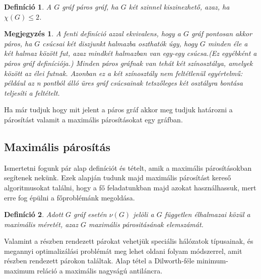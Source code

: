\documentclass[12pt]{article}
\newtheorem{defin}{Definíció}[section]
\newtheorem{megj}{Megjegyzés}[section]
\begin{document}
\begin{defin}
A $G$ gráf páros gráf, ha $G$ két szinnel kiszinezhető, azaz, ha $\chi(G) \leq 2$. ~\cite{szam:Fleiner}
\end{defin}

\begin{megj}
A fenti definíció azzal ekvivalens, hogy a $G$ gráf pontosan akkor páros, ha $G$ csúcsai két diszjunkt halmazba oszthatók úgy, hogy $G$ minden éle a két halmaz között fut, azaz mindkét halmazban van egy-egy csúcsa.(Ez egyébként a páros gráf definíciója.) Minden páros gráfnak van tehát két színosztálya, amelyek között az élei futnak. Azonban ez a két színosztály nem feltétlenül egyértelmű: például az n pontból álló üres gráf csúcsainak tetszőleges két osztályra bontása teljesíti a feltételt.
\end{megj}

Ha már tudjuk hogy mit jelent a páros gráf akkor meg tudjuk határozni a párosítást valamit a maximális párosításokat egy gráfban.\\

\subsection{Maximális párosítás}

Ismertetni fogunk pár alap definíciót és tételt, amik a maximális párosításokban segítenek nekünk. Ezek alapján tudunk majd maximális párosítást kereső algoritmusokat találni, hogy a fő feladatunkban majd azokat használhassuk, mert erre fog épülni a főproblémánk megoldása.\\

\begin{defin}
Adott $G$ gráf esetén $\nu(G)$ jelöli a $G$ független élhalmazai közül a maximális méretét, azaz $G$ maximális párositásának elemszámát. ~\cite{szam:Fleiner}
\end{defin}

Valamint a részben rendezett párokat vehetjük speciális hálózatok típusainak, és megannyi optimalizálási problémát meg lehet oldani folyam módszerrel, amit részben rendezett párokon találtak. Alap tétel a Dilworth-féle minimum-maximum reláció a maximális nagyságú antiláncra. \\
\end{document}
